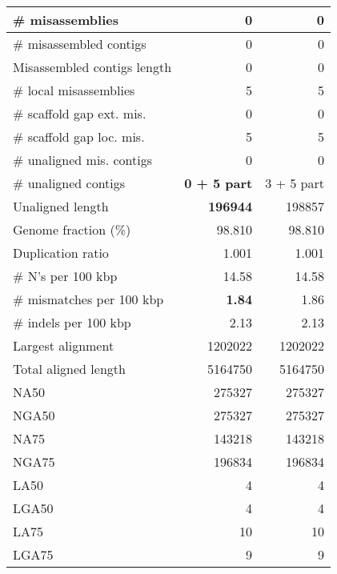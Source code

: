 \documentclass[12pt,a4paper]{article}
\begin{document}
\begin{table}[ht]
\begin{center}
\begin{tabular}{|l*{2}{|r}|}
\# misassemblies & 0 & 0 \\ \hline
\# misassembled contigs & 0 & 0 \\ \hline
Misassembled contigs length & 0 & 0 \\ \hline
\# local misassemblies & 5 & 5 \\ \hline
\# scaffold gap ext. mis. & 0 & 0 \\ \hline
\# scaffold gap loc. mis. & 5 & 5 \\ \hline
\# unaligned mis. contigs & 0 & 0 \\ \hline
\# unaligned contigs & {\bf 0 + 5 part} & 3 + 5 part \\ \hline
Unaligned length & {\bf 196944} & 198857 \\ \hline
Genome fraction (\%) & 98.810 & 98.810 \\ \hline
Duplication ratio & 1.001 & 1.001 \\ \hline
\# N's per 100 kbp & 14.58 & 14.58 \\ \hline
\# mismatches per 100 kbp & {\bf 1.84} & 1.86 \\ \hline
\# indels per 100 kbp & 2.13 & 2.13 \\ \hline
Largest alignment & 1202022 & 1202022 \\ \hline
Total aligned length & 5164750 & 5164750 \\ \hline
NA50 & 275327 & 275327 \\ \hline
NGA50 & 275327 & 275327 \\ \hline
NA75 & 143218 & 143218 \\ \hline
NGA75 & 196834 & 196834 \\ \hline
LA50 & 4 & 4 \\ \hline
LGA50 & 4 & 4 \\ \hline
LA75 & 10 & 10 \\ \hline
LGA75 & 9 & 9 \\ \hline
\end{tabular}
\end{center}
\end{table}
\end{document}
